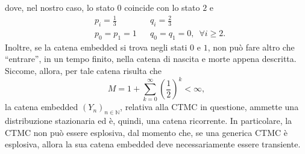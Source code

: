 \documentclass[12pt]{homework}
\begin{document}
\begin{alphaparts}
\begin{equation*}
\end{equation*}
dove, nel nostro caso, lo stato $0$ coincide con lo stato $2$ e
\begin{align*}
&p_{i}=\frac{1}{3}&&q_{i}=\frac{2}{3}\\
&p_{0}=p_{1}=1 && q_{0}=q_{1}=0, \,\,\, \forall i\geq 2.
\end{align*} 
Inoltre, se la catena embedded  si trova negli stati $0$ e $1$, non può fare altro che ``entrare'', in un tempo finito, nella catena di nascita e morte appena descritta.\\
Siccome, allora, per tale catena risulta che
\begin{equation*}
M=1+\sum_{k=0}^{\infty}\left(\frac{1}{2}\right)^{k}<\infty,
\end{equation*} 
la catena embedded $\left(Y_{n}\right)_{n\in\mathbb{N}}$, relativa alla CTMC in questione, ammette una distribuzione stazionaria ed è, quindi, una catena ricorrente. In particolare, la CTMC non può essere esplosiva, dal momento che, se una generica CTMC è esplosiva, allora la sua catena embedded deve necessariamente essere transiente. 

  \end{alphaparts}
  
  
  \newpage
\end{document}
